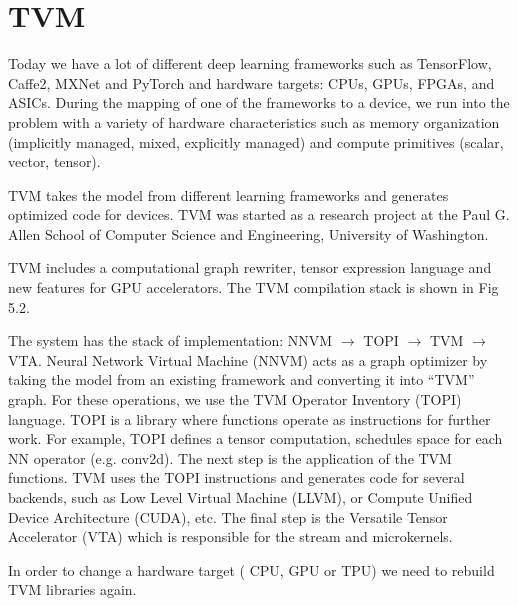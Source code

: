 \section{TVM}

Today we have a lot of different deep learning frameworks such as TensorFlow, Caffe2, MXNet and PyTorch and hardware targets: CPUs, GPUs, FPGAs, and ASICs. During the mapping of one of the frameworks to a device, we run into the problem with a variety of hardware characteristics such as memory organization (implicitly managed, mixed, explicitly managed) and compute primitives (scalar, vector, tensor).

TVM takes the model from different learning frameworks and generates optimized code for devices. TVM was started as a research project at the Paul G. Allen School of Computer Science and Engineering, University of Washington.

TVM includes a computational graph rewriter, tensor expression language and new features for GPU accelerators. The TVM compilation stack is shown in Fig 5.2.

The system has the stack of implementation: NNVM $\to$ TOPI $\to$ TVM $\to$ VTA. Neural Network Virtual Machine (NNVM) acts as a graph optimizer by taking the model from an existing framework and converting it into “TVM” graph. For these operations, we use the TVM Operator Inventory (TOPI) language. TOPI is a library where functions operate as instructions for further work. For example, TOPI defines a tensor computation, schedules space for each NN operator (e.g. conv2d). The next step is the application of the TVM functions. TVM uses the TOPI instructions and generates code for several backends, such as Low Level Virtual Machine (LLVM), or Compute Unified Device Architecture (CUDA), etc. The final step is the Versatile Tensor Accelerator (VTA) which is responsible for the stream and microkernels. 

In order to change a hardware target ( CPU, GPU or TPU) we need to rebuild TVM libraries again.  

